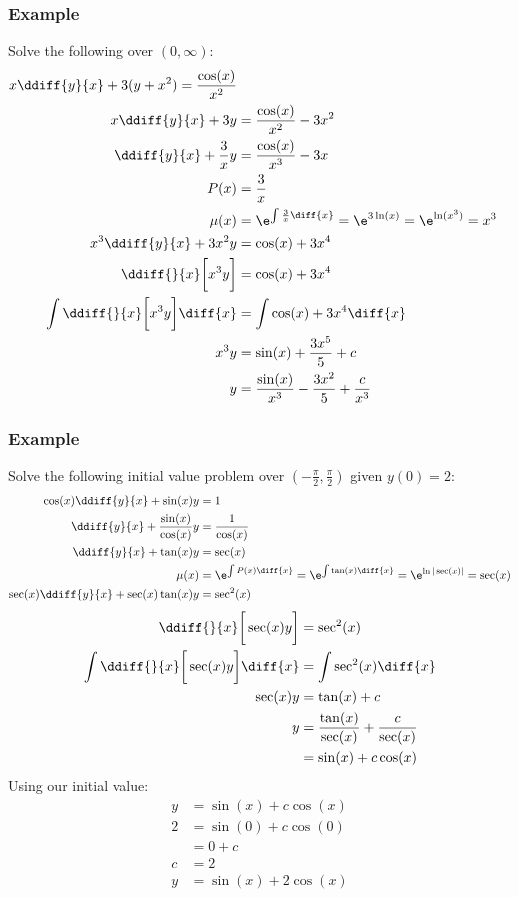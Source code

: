 \documentclass{math}
\begin{document}
\subsubsection*{Example}
Solve the following over \( (0,\infty) \):
\begin{align*}
  x\ddiff{y}{x}+3(y+x^2) = \frac{\cos(x)}{x^2} \\
  x\ddiff{y}{x}+3y &= \frac{\cos(x)}{x^2}-3x^2 \\
  \ddiff{y}{x}+\frac{3}{x}y &= \frac{\cos(x)}{x^3}-3x \\
  P(x) &= \frac{3}{x} \\
  \mu(x) &= \e^{\int\frac{3}{x}\diff{x}}
    = \e^{3\ln(x)} = \e^{\ln(x^3)} = x^3 \\
  x^3\ddiff{y}{x}+3x^2y &= \cos(x)+3x^4 \\
  \ddiff{}{x}\bigg[x^3y\bigg] &= \cos(x)+3x^4 \\
  \int\ddiff{}{x}\bigg[x^3y\bigg]\diff{x} &= \int\cos(x)+3x^4\diff{x} \\
  x^3y &= \sin(x)+\frac{3x^5}{5}+c \\
  y &= \frac{\sin(x)}{x^3}-\frac{3x^2}{5}+\frac{c}{x^3}
\end{align*}

\subsubsection*{Example}
Solve the following initial value problem over \( (-\frac{\pi}{2},\frac{\pi}{2})
\) given \( y(0) = 2 \):
\begin{align*}
  \cos(x)\ddiff{y}{x}+\sin(x)y &= 1 \\
  \ddiff{y}{x}+\frac{\sin(x)}{\cos(x)}y &= \frac{1}{\cos(x)} \\
  \ddiff{y}{x}+\tan(x)y &= \sec(x) \\
  \mu(x) &= \e^{\int P(x)\diff{x}} = \e^{\int\tan(x)\diff{x}} =
    \e^{\ln|\sec(x)|} = \sec(x) \\
  \sec(x)\ddiff{y}{x}+\sec(x)\tan(x)y &= \sec^2(x)
\end{align*}
\begin{align*}
  \ddiff{}{x}\bigg[\sec(x)y\bigg] &= \sec^2(x) \\
  \int\ddiff{}{x}\bigg[\sec(x)y\bigg]\diff{x} &= \int\sec^2(x)\diff{x} \\
  \sec(x)y &= \tan(x)+c \\
  y &= \frac{\tan(x)}{\sec(x)}+\frac{c}{\sec(x)} \\
  &= \sin(x)+c\cos(x)
\end{align*}
Using our initial value:
\begin{align*}
  y &= \sin(x)+c\cos(x) \\
  2 &= \sin(0)+c\cos(0) \\
  &= 0+c \\
  c &= 2 \\
  y &= \sin(x)+2\cos(x)
\end{align*}
\end{document}
